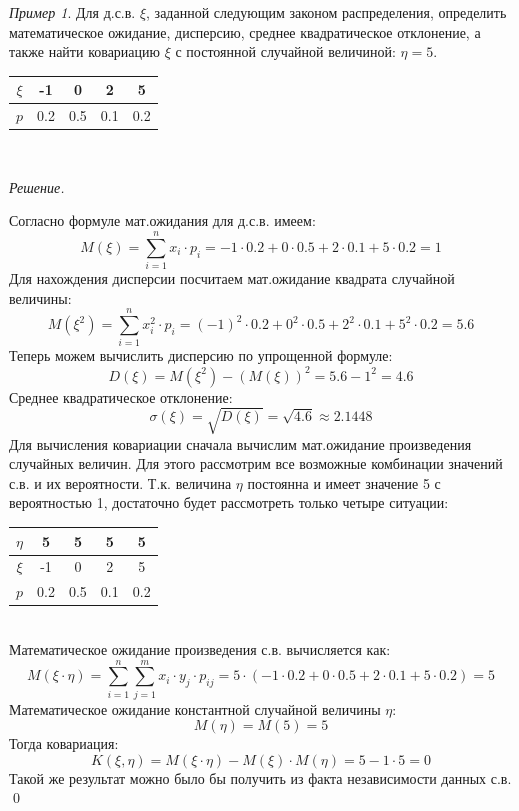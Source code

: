 \documentclass[12pt,a4paper]{article}
\theoremstyle{definition}
\theoremstyle{definition}
\theoremstyle{remark}
\theoremstyle{corollary}
\newcommand{\nextblock}{\vspace{1.5em}\noindent}
\theoremstyle{bolditalic}
\newtheorem{example}{Пример}[section]
\newenvironment{solution}{
    \vspace{0.5em}
    \noindent\textit{Решение.}
}{\qed\vspace{1em}}
\begin{document}
\nextblock

\begin{example}
    Для д.с.в. $\xi$, заданной следующим законом распределения, определить математическое ожидание, дисперсию, среднее квадратическое отклонение, а также найти ковариацию $\xi$ с постоянной случайной величиной: $\eta = 5$.\\
    
    \centering
    \begin{tabular}{|c|c|c|c|c|}
    \hline
    $\xi$ & -1 & 0 & 2 & 5 \\
    \hline
    $p$ & 0.2 & 0.5 & 0.1 & 0.2 \\
    \hline
    \end{tabular}\\
\end{example}
\begin{solution}
    Согласно формуле мат.ожидания для д.с.в. имеем:
     \[
     M(\xi) = \sum_{i=1}^{n}{x_i \cdot p_i} = -1\cdot0.2+0\cdot0.5+2\cdot0.1+5\cdot0.2=1
     \]
    Для нахождения дисперсии посчитаем мат.ожидание квадрата случайной величины:
     \[
     M(\xi^2) = \sum_{i=1}^{n}{x_i^2 \cdot p_i} = (-1)^2\cdot0.2+0^2\cdot0.5+2^2\cdot0.1+5^2\cdot0.2=5.6
     \]
     Теперь можем вычислить дисперсию по упрощенной формуле:
    \[
    D(\xi)=M(\xi^2)-(M(\xi))^2 = 5.6-1^2=4.6
    \]
    Среднее квадратическое отклонение:
    \[
    \sigma(\xi)=\sqrt{D(\xi)} = \sqrt{4.6} \approx 2.1448
    \]
    Для вычисления ковариации сначала вычислим мат.ожидание произведения случайных величин. Для этого рассмотрим все возможные комбинации значений с.в. и их вероятности. Т.к. величина $\eta$ постоянна и имеет значение 5 с вероятностью 1, достаточно будет рассмотреть только четыре ситуации:\\
    
    \begin{center}
    \begin{tabular}{|c|c|c|c|c|}
    \hline
    $\eta$ & 5 & 5 & 5 & 5 \\
    \hline
    $\xi$ & -1 & 0 & 2 & 5 \\
    \hline
    $p$ & 0.2 & 0.5 & 0.1 & 0.2 \\
    \hline
    \end{tabular}
    \end{center}\\

    Математическое ожидание произведения с.в. вычисляется как:
    \[
    M(\xi\cdot \eta)=\sum_{i=1}^{n}{\sum_{j=1}^{m}{x_i\cdot y_j \cdot p_{ij}}}=5\cdot (-1\cdot0.2+0\cdot0.5+2\cdot0.1+5\cdot0.2)=5
    \]
    Математическое ожидание константной случайной величины $\eta$: 
    \[
    M(\eta)=M(5)=5
    \]
    Тогда ковариация:
    \[
    K(\xi, \eta)=M(\xi \cdot \eta) - M(\xi)\cdot M(\eta)=5-1\cdot5=0
    \]
    Такой же результат можно было бы получить из факта независимости данных с.в. 
\end{solution}
\end{document}
